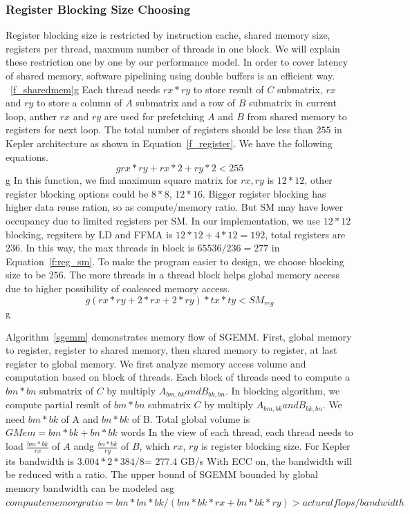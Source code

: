 \documentclass{sig-alternate-05-2015}
\begin{document}
\subsubsection{Register Blocking Size Choosing}
Register blocking size is restricted by instruction cache, shared memory size, registers per thread,
maxmum number of threads in one block. We will explain these restriction one by one by our performance model.
In order to cover latency of shared memory, software pipelining using double
buffers is an efficient way. ~\ref{f_sharedmem}g
Each thread needs $rx*ry$ to store result of $C$ submatrix, $rx$ and $ry$ to store a column of $A$
submatrix and a row of $B$ submatrix in current loop, anther $rx$ and $ry$ are used for prefetching $A$ and $B$ from shared memory to
registers for next loop. The total number of registers should be less than $255$ in Kepler architecture as shown in Equation~\ref{f_register}.
We have the following equations.
\begin{equation}g
    rx*ry + rx *2 + ry*2 < 255
\label{f_register}
\end{equation}g
In this function, we find maximum square matrix for $rx, ry$ is $12*12$, other register blocking options could be $8*8$, $12*16$.
Bigger register blocking has higher data reuse ration, so as compute/memory ratio. But SM may have
lower occupancy due to limited registers per SM. In our implementation, we use $12*12$ blocking,
regsiters by LD and FFMA is $12*12+4*12=192$, total registers are $236$.
In this way, the max threads in block is  $65536/236=277$ in Equation~\ref{f:reg_sm}.
To make the program easier to design, we choose blocking size to be $256$. The more threads in a
thread block helps global memory access due to higher possibility of coalesced memory access.
\begin{equation}g
    (rx*ry + 2*rx + 2*ry)*tx*ty < SM_{reg}
    \label{f:reg_sm}
\end{equation}g

Algorithm~\ref{sgemm} demonstrates memory flow of SGEMM. First, global memory to register, register to shared
memory, then shared memory to register,  at last register to global memory.
We first analyze memory access volume and computation based on block of threads.
Each block of threads need to compute a $bm*bn$ submatrix of $C$ by multiply $A_{bm,bk} and B_{bk,
bn}$. In blocking algorithm, we compute partial result of $bm*bn$ submatrix $C$ by multiply $A_{bm,bk} and
B_{bk,bn}$.  We need $bm*bk$ of A and $bn*bk$ of B.
Total global volume is $GMem= bm*bk + bn*bk$ words
In the view of each thread, each thread needs to load  $\frac{bm*bk}{rx}$ of $A$ andg
$\frac{bn*bk}{ry}$ of $B$, which $rx$, $ry$ is register blocking size.
For Kepler its bandwidth is $3.004*2*384/8$= 277.4 GB/s
With ECC on, the bandwidth will be reduced with a ratio.
The upper bound of SGEMM bounded by global memory bandwidth can be modeled asg
$compuate memory ratio =  bm*bn*bk/(bm*bk*rx + bn*bk*ry)> actural flops/ bandwidth $
\end{document}
